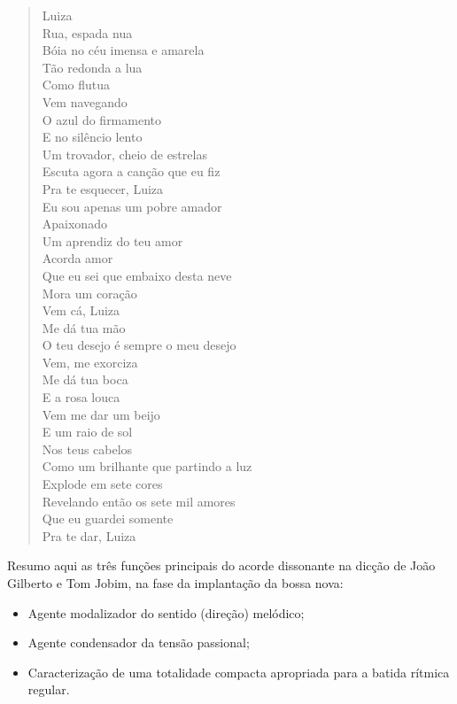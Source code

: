 \begin{verse}
\small{Luiza\\
Rua, espada nua\\
Bóia no céu imensa e amarela\\
Tão redonda a lua\\
Como flutua\\
Vem navegando\\
O azul do firmamento\\
E no silêncio lento\\
Um trovador, cheio de estrelas\\
Escuta agora a canção que eu fiz\\
Pra te esquecer, Luiza\\
Eu sou apenas um pobre amador\\
Apaixonado\\
Um aprendiz do teu amor\\
Acorda amor\\
Que eu sei que embaixo desta neve\\
Mora um coração\\
Vem cá, Luiza\\
Me dá tua mão\\
O teu desejo é sempre o meu desejo\\
Vem, me exorciza\\
Me dá tua boca\\
E a rosa louca\\
Vem me dar um beijo\\
E um raio de sol\\
Nos teus cabelos\\
Como um brilhante que partindo a luz\\
Explode em sete cores\\
Revelando então os sete mil amores\\
Que eu guardei somente\\
Pra te dar, Luiza}
\end{verse}

Resumo aqui as três funções principais do acorde dissonante na dicção de
João Gilberto e Tom Jobim, na fase da implantação da bossa nova:

\begin{itemize}
\item
  Agente modalizador do sentido (direção) melódico;
\item
  Agente condensador da tensão passional;
\item
  Caracterização de uma totalidade compacta apropriada para a batida
  rítmica regular.
\end{itemize}

